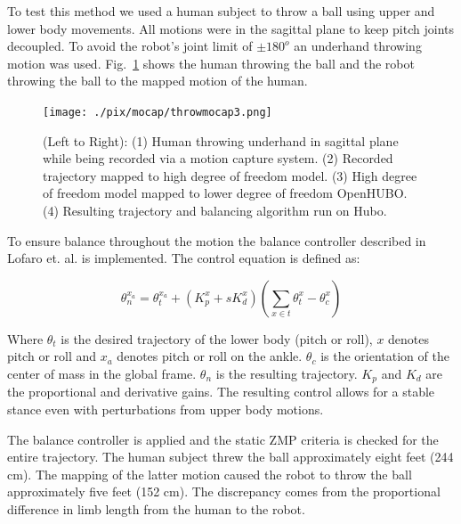 To test this method we used a human subject to throw a ball using upper and lower body movements.  
All motions were in the sagittal plane to keep pitch joints decoupled.  
To avoid the robot's joint limit of $\pm180^o$ an underhand throwing motion was used.
Fig.~\ref{fig:mocap-underhand} shows the human throwing the ball and the robot throwing the ball to the mapped motion of the human.

\begin{figure}[t]
  \centering
\texttt{[image: ./pix/mocap/throwmocap3.png]}
  \caption{(Left to Right): (1) Human throwing underhand in sagittal plane while being recorded via a motion capture system.  (2) Recorded trajectory mapped to high degree of freedom model.  (3) High degree of freedom model mapped to lower degree of freedom OpenHUBO.  (4) Resulting trajectory and balancing algorithm run on Hubo.}
  \label{fig:mocap-underhand}
\end{figure}

To ensure balance throughout the motion the balance controller described in Lofaro et. al.\cite{LofaroHumanoids2012} is implemented.  The control equation is defined as:

\begin{equation}\label{eq:bal}
\theta_n^{x_a} = \theta_t^{x_a} + \left(K_p^x+sK_d^x\right)\left(\sum\limits_{x \in t} \theta_{t}^x - \theta_{c}^x\right)
\end{equation}

Where $\theta_t$ is the desired trajectory of the lower body (pitch or roll), $x$ denotes pitch or roll and $x_a$ denotes pitch or roll on the ankle.  $\theta_{c}$ is the orientation of the center of mass in the global frame.  $\theta_n$ is the resulting trajectory.  $K_p$ and $K_d$ are the proportional and derivative gains.  The resulting control allows for a stable stance even with perturbations from upper body motions.

The balance controller is applied and the static ZMP criteria is checked for the entire trajectory.
The human subject threw the ball approximately eight feet (244 cm).  
The mapping of the latter motion caused the robot to throw the ball approximately five feet (152 cm).
The discrepancy comes from the proportional difference in limb length from the human to the robot.




